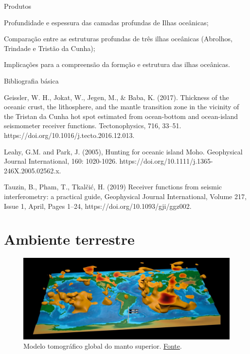 \documentclass[10pt,a4paper,oneside]{book}
\newcommand{\HeroFigPad}{\vspace{-1cm}}
\begin{document}
\begin{fancyenum}{\faShoppingCart}{Produtos}
	\item Profundidade e espessura das camadas profundas de Ilhas oceânicas;
	\item Comparação entre as estruturas profundas de três ilhas oceânicas (Abrolhos, Trindade e Tristão da Cunha);	
	\item Implicações para a compreensão da formção e estrutura das ilhas oceânicas.
\end{fancyenum}

\begin{fancyenum}{\faBook}{Bibliografia básica}
	\item Geissler, W. H., Jokat, W., Jegen, M., \& Baba, K. (2017). Thickness of the oceanic crust, the lithosphere, and the mantle transition zone in the vicinity of the Tristan da Cunha hot spot estimated from ocean-bottom and ocean-island seismometer receiver functions. Tectonophysics, 716, 33–51. https://doi.org/10.1016/j.tecto.2016.12.013.
	\item Leahy, G.M. and Park, J. (2005), Hunting for oceanic island Moho. Geophysical Journal International, 160: 1020-1026. https://doi.org/10.1111/j.1365-246X.2005.02562.x.
	\item Tauzin, B., Pham, T., Tkalčić, H. (2019) Receiver functions from seismic interferometry: a practical guide, Geophysical Journal International, Volume 217, Issue 1, April, Pages 1–24, https://doi.org/10.1093/gji/ggz002.
\end{fancyenum}


\chapter{Ambiente terrestre}
\label{cap_terra}

\begin{figure}[h]
	\HeroFigPad
	\begin{center}
		\includegraphics[width=\textwidth]{images/globe_structure.jpg}
	\end{center}
	\caption{
	Modelo tomográfico global do manto superior. \href{https://www.olcf.ornl.gov/2017/03/28/a-seismic-mapping-milestone/}{Fonte}.
    }
 \label{fig_structure}
\end{figure}
\end{document}
